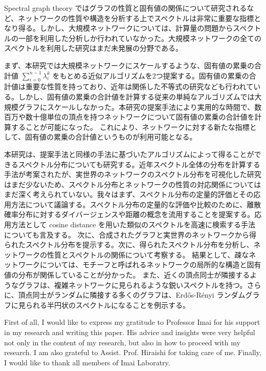 \documentclass[senior,final,11pt]{iscs-thesis}
\begin{document}
\begin{jabstract}
    Spectral graph theory ではグラフの性質と固有値の関係について研究されるなど、ネットワークの性質や構造を分析する上でスペクトルは非常に重要な指標となり得る。しかし、大規模ネットワークについては、計算量の問題からスペクトルの一部を利用した分析しか行われていなかった。大規模ネットワークの全てのスペクトルを利用した研究はまだ未発展の分野である。

    まず、本研究では大規模ネットワークにスケールするような、固有値の累乗の合計値 $\sum_{i=0}^{n-1} \lambda_i^k$ をもとめる近似アルゴリズムを2つ提案する。固有値の累乗の合計値は重要な性質を持っており、近年は関係した不等式の研究なども行われている。しかし、固有値の累乗の合計値を計算する従来の単純なアルゴリズムでは大規模グラフにスケールしなかった。本研究の提案手法により実用的な時間で、数百万や数十億単位の頂点を持つネットワークについて固有値の累乗の合計値を計算することが可能になった。 これにより、ネットワークに対する新たな指標として、固有値の累乗の合計値というものが利用可能となる。

    本研究は、提案手法と同様の手法に基づいたアルゴリズムによって得ることができるスペクトル分布についても研究する。近年スペクトル全体の分布を計算する手法が考案されたが、実世界のネットワークのスペクトル分布を可視化した研究はまだ少ないため、スペクトル分布とネットワークの性質の対応関係についてはまだ深く考えられていない。我々はまず、スペクトル分布の定量的評価とその応用方法について議論する。スペクトル分布の定量的な評価や比較のために、離散確率分布に対するダイバージェンスや距離の概念を流用することを提案する。応用方法として cosine distance を用いた類似のスペクトルを高速に検索する手法についても言及する。 次に、合成されたグラフと実世界のネットワークから得られたスペクトル分布を提示する。次に、得られたスペクトル分布を分析し、ネットワークの性質とスペクトルの関係について考察する。 結果として、疎なネットワークについては、モチーフと呼ばれるネットワークの局所的な構造と固有値の分布が関係していることが分かった。 また、近くの頂点同士が隣接するようなグラフは、複雑ネットワークに見られるような鋭いスペクトルを持つ。さらに、頂点同士がランダムに隣接する多くのグラフは、Erdős-Rényi ランダムグラフに見られる半円状のスペクトルになることを例示する。


\end{jabstract}
\maketitle

\begin{acknowledge}
    First of all, I would like to express my gratitude to Professor Imai for his support in my research and writing this paper. His advice and insights were very helpful not only in the content of my research, but also in how to proceed with my research. I am also grateful to Assist. Prof. Hiraishi for taking care of me. Finally, I would like to thank all members of Imai Laboratry.
\end{acknowledge}
\end{document}
